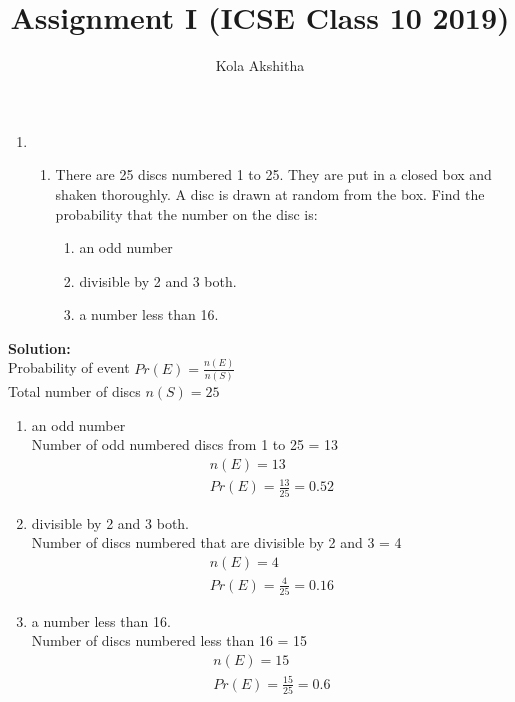 \documentclass[journal,12pt,twocolumn]{IEEEtran}
\newcommand{\solution}{\noindent \textbf{Solution: }}
\begin{document}
\vspace{3cm}
\title{Assignment I (ICSE Class 10 2019)}
\author{Kola Akshitha}
\maketitle
\begin{enumerate}[label=\arabic{enumi} , start = 5]
\item
\begin{enumerate}[label=\alph{enumii}) , start = 1]
\item There are 25 discs numbered 1 to 25. They are put in a closed box and shaken thoroughly. A disc is drawn at random from the box. 
Find the probability that the number on the disc is:
\begin{enumerate}[label=(\roman{enumiii})]
    \item an odd number
    \item divisible by 2 and 3 both.
    \item a number less than 16.
\end{enumerate}
\end{enumerate}
\end{enumerate}
\solution\\
Probability of event \begin{math} Pr(E) = \frac{n(E)}{n(S)} \end{math} \\
Total number of discs \begin{math} n(S) = 25 \end{math} \\
\begin{enumerate}[label=(\roman{enumi})]
    \item an odd number\\
   Number of odd numbered discs from 1 to 25 = 13\begin{align*} n(E) = 13 \\
    Pr(E) = \frac{13}{25} = 0.52
     \end{align*}
     
     
    \item divisible by 2 and 3 both.\\
    Number of discs numbered that are divisible by 2 and 3 = 4\begin{align*}
    n(E) = 4 \\
    Pr(E) = \frac{4}{25} = 0.16
    \end{align*}
    
    \item a number less than 16.\\
   Number of discs numbered less than 16 = 15 \begin{align*}n(E) = 15\\
    Pr(E) = \frac{15}{25} = 0.6
    \end{align*}
    
\end{enumerate}
\end{document}
